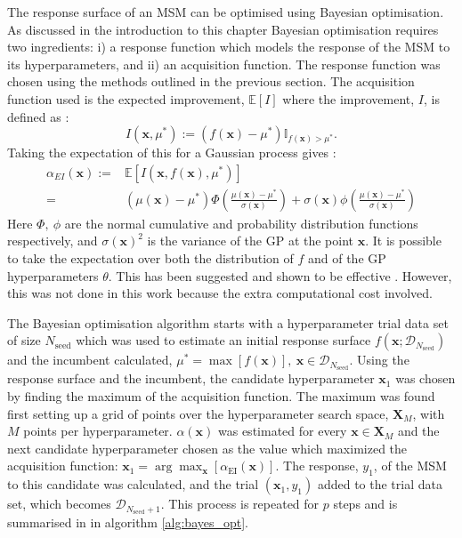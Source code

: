 The response surface of an MSM can be optimised using Bayesian optimisation. As discussed in the introduction to this chapter Bayesian optimisation requires two ingredients: i) a response function which models the response of the MSM to its hyperparameters, and ii) an acquisition function. The response function was chosen using the methods outlined in the previous section. The acquisition function used is the expected improvement, $\mathbb{E}\left[I\right]$ where the improvement, $I$, is defined as \cite{shahriariTakingHumanOut2016}:
\begin{equation}
    I(\mathbf{x}, \mu^{*}):=(f(\mathbf{x}) - \mu^{*}) \mathbb{I}_{f(\mathbf{x}) > \mu^{*}}.
\end{equation}
Taking the expectation of this for a Gaussian process gives \cite{shahriariTakingHumanOut2016}:
\begin{align}\label{eqn:msm_ei_def}
        \alpha_{EI}(\mathbf{x}) := &  \mathbb{E}\left[I(\mathbf{x}, f(\mathbf{x}), \mu^{*})\right] \\
         =  &(\mu(\mathbf{x}) - \mu^{*})\Phi\left( \frac{ \mu(\mathbf{x}) - \mu^{*} }{\sigma(\mathbf{x})} \right ) + \sigma(\mathbf{x})\phi\left( \frac{ \mu(\mathbf{x}) - \mu^{*} }{\sigma(\mathbf{x}) } \right )
\end{align}
Here $\Phi,\ \phi$ are the normal cumulative and probability distribution functions respectively, and $\sigma(\mathbf{x})^{2}$ is the variance of the GP at the point $\mathbf{x}$. It is possible to take the expectation over both the distribution of $f$ and of the GP hyperparameters $\theta$. This has been suggested and shown to be effective \cite{NIPS2012_4522}. However, this was not done in this work because the extra computational cost involved. 

The Bayesian optimisation algorithm starts with a hyperparameter trial data set of size $N_{\mathrm{seed}}$ which was used to estimate an initial response surface $f(\mathbf{x}; \mathcal{D}_{N_{\mathrm{seed}}})$ and the incumbent calculated, $\mu^{*} = \max{\left[f(\mathbf{x})\right]},\ \mathbf{x}\in \mathcal{D}_{N_{\mathrm{seed}}}$. Using the response surface and the incumbent, the  candidate hyperparameter $\mathbf{x}_{1}$ was chosen by finding the maximum of the acquisition function. The maximum was found first setting up a grid of points over the hyperparameter search space, $\mathbf{X}_{M}$, with $M$ points per hyperparameter.  $\alpha(\mathbf{x})$ was estimated for every $\mathbf{x}\in \mathbf{X}_{M}$ and the next candidate hyperparameter chosen as the value which maximized the acquisition function: $\mathbf{x}_{1} = \arg\max_{\mathbf{x}}\left[ \alpha_{\mathrm{EI}}(\mathbf{x})\right]$. The response, $y_{1}$, of the MSM to this candidate was calculated, and the trial $(\mathbf{x}_{1}, y_{1})$ added to the trial data set, which becomes  $\mathcal{D}_{N_{\mathrm{seed}}+1}$. This process is repeated for $p$ steps and is summarised in in algorithm \ref{alg:bayes_opt}.

